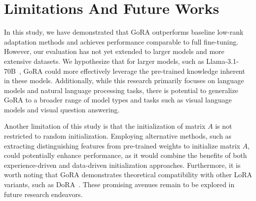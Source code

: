 \section{Limitations And Future Works}
In this study, we have demonstrated that GoRA outperforms baseline low-rank adaptation methods and achieves performance comparable to full fine-tuning. However, our evaluation has not yet extended to larger models and more extensive datasets. We hypothesize that for larger models, such as Llama-3.1-70B~\citep{dubey2024llama3}, GoRA could more effectively leverage the pre-trained knowledge inherent in these models. Additionally, while this research primarily focuses on language models and natural language processing tasks, there is potential to generalize GoRA to a broader range of model types and tasks such as visual language models and visual question answering.

Another limitation of this study is that the initialization of matrix \(A\) is not restricted to random initialization. Employing alternative methods, such as extracting distinguishing features from pre-trained weights to initialize matrix 
\(A\), could potentially enhance performance, as it would combine the benefits of both experience-driven and data-driven initialization approaches. Furthermore, it is worth noting that GoRA demonstrates theoretical compatibility with other LoRA variants, such as DoRA~\citep{liu2024dora}. These promising avenues remain to be explored in future research endeavors.